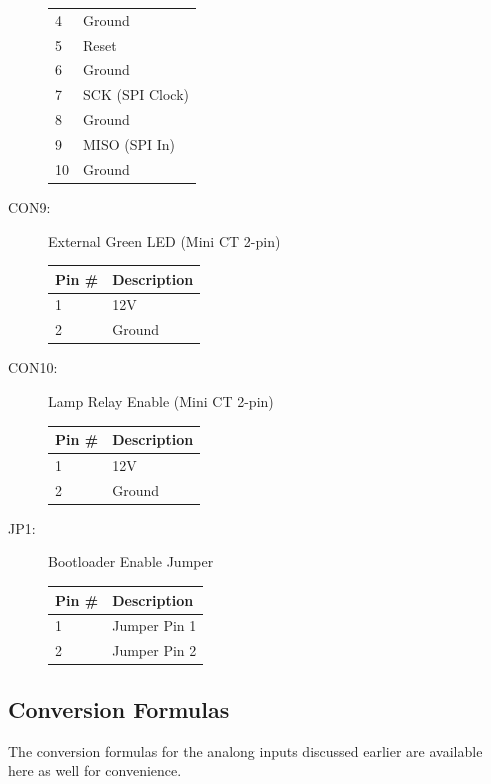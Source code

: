 \documentclass{article}
\begin{document}
\begin{description}
\begin{center}
\begin{tabular}{l|l}
            4  & Ground \\
            5  & Reset \\
            6  & Ground \\
            7  & SCK (SPI Clock) \\
            8  & Ground \\
            9  & MISO (SPI In) \\
            10 & Ground \\
        \end{tabular}
    \end{center}
  \item[CON9:] External Green LED (Mini CT 2-pin) \\
    \begin{center}
        \begin{tabular}{l|l}
            Pin \# & Description \\
            \hline
            1 & 12V \\
            2 & Ground \\
        \end{tabular}
    \end{center}
  \item[CON10:] Lamp Relay Enable (Mini CT 2-pin) \\
    \begin{center}
        \begin{tabular}{l|l}
            Pin \# & Description \\
            \hline
            1 & 12V \\
            2 & Ground \\
        \end{tabular}
    \end{center}
  \item[JP1:] Bootloader Enable Jumper \\
    \begin{center}
        \begin{tabular}{l|l}
            Pin \# & Description \\
            \hline
            1 & Jumper Pin 1 \\
            2 & Jumper Pin 2 \\
        \end{tabular}
    \end{center}
\end{description}

\subsection{Conversion Formulas} \label{ssec:ConversionFormulas}
The conversion formulas for the analong inputs discussed earlier are available here as well for
convenience.
\end{document}
